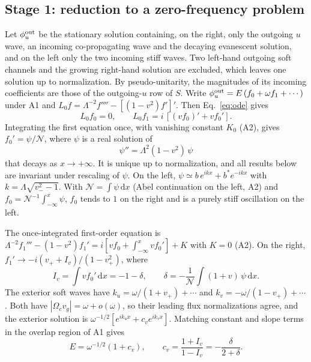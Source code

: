 \documentclass[10pt,a4paper]{article}
\newcommand{\dd}{\mathrm d}
\begin{document}
\subsection{Stage 1: reduction to a zero-frequency problem}
\label{sec:stage1}
Let $\phi^{\rm out}_u$ be the stationary solution containing, on the right,
only the outgoing $u$ wave, an incoming co-propagating wave and the decaying
evanescent solution, and on the left only the two incoming stiff waves.
Two left-hand outgoing soft channels and the growing right-hand solution are
excluded, which leaves one solution up to normalization. By
pseudo-unitarity, the magnitudes of its incoming coefficients are those of
the outgoing-$u$ row of $S$. Write $\phi^{\rm out}_u=E\,(f_0+\omega
f_1+\cdots)$ under A1 and $L_0f=\Lambda^{-2}f''''-[(1-v^2)f']'$. Then
Eq.~\eqref{eq:ode} gives
\begin{equation}
 L_0f_0=0,\qquad L_0f_1=i\,[(vf_0)'+vf_0'].
\end{equation}
Integrating the first equation once, with vanishing constant $K_0$ (A2),
gives $f_0'=\psi/\mathcal{N}$, where $\psi$ is a real solution of
\begin{equation}
 \psi''=\Lambda^2(1-v^2)\,\psi
 \label{eq:psi}
\end{equation}
that decays as $x\to+\infty$. It is unique up to normalization, and all
results below are invariant under rescaling of $\psi$. On the left,
$\psi\simeq b\,e^{ikx}+b^*e^{-ikx}$ with $k=\Lambda\sqrt{v_-^2-1}$. With
$\mathcal{N}=\int\psi\,\dd x$ (Abel continuation on the left, A2) and
$f_0=\mathcal{N}^{-1}\int_{-\infty}^x\psi$, $f_0$ tends to $1$ on the right and is a
purely stiff oscillation on the left.

The once-integrated first-order equation is
$\Lambda^{-2}f_1'''-(1-v^2)f_1'=i[vf_0+\int_{-\infty}^x vf_0']+K$ with
$K=0$ (A2). On the right, $f_1'\to-i(v_++I_v)/(1-v_+^2)$, where
\begin{equation}
 I_v=\int vf_0'\,\dd x=-1-\delta,\qquad
 \delta=-\frac{1}{\mathcal{N}}\int(1+v)\,\psi\,\dd x .
\end{equation}
The exterior soft waves have $k_u=\omega/(1+v_+)+\cdots$ and
$k_v=-\omega/(1-v_+)+\cdots$. Both have $|\Omega_cv_g|=\omega+o(\omega)$,
so their leading flux normalizations agree, and the exterior solution is
$\omega^{-1/2}[e^{ik_ux}+c_ve^{ik_vx}]$. Matching constant and slope terms in
the overlap region of A1 gives
\begin{equation}
 E=\omega^{-1/2}(1+c_v),\qquad
 c_v=\frac{1+I_v}{1-I_v}=-\frac{\delta}{2+\delta}.
\end{equation}
\end{document}
